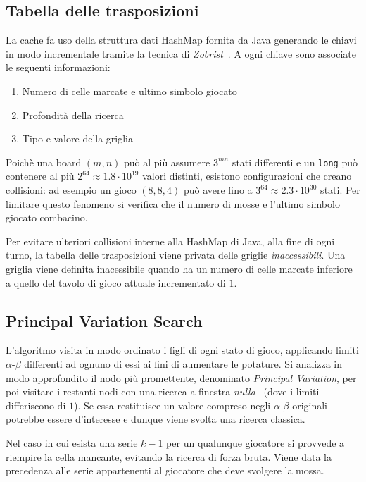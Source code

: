 \documentclass{article}
\begin{document}
\subsection*{Tabella delle trasposizioni}

La cache fa uso della struttura dati HashMap fornita da Java generando le chiavi 
in modo incrementale tramite la tecnica di \emph{Zobrist}~\cite{zobrist}. A ogni
chiave sono associate le seguenti informazioni:
\begin{enumerate}
  \item Numero di celle marcate e ultimo simbolo giocato
  \item Profondit\`a della ricerca
  \item Tipo e valore della griglia
\end{enumerate}
Poich\`e una board $(m,n)$ pu\`o al pi\`u assumere $3^{mn}$ stati differenti e
un \verb!long! pu\`o contenere al pi\`u $2^{64} \approx 1.8 \cdot 10^{19}$ valori distinti,
esistono configurazioni che creano collisioni: ad esempio un gioco $(8, 8, 4)$
pu\`o avere fino a $3^{64} \approx 2.3 \cdot 10^{30}$ stati. Per limitare questo
fenomeno si verifica che il numero di mosse e l'ultimo simbolo giocato combacino.

Per evitare ulteriori collisioni interne alla HashMap di Java, alla fine di
ogni turno, la tabella delle trasposizioni viene privata delle griglie \emph{
inaccessibili}. Una griglia viene definita inacessibile quando ha un numero di
celle marcate inferiore a quello del tavolo di gioco attuale incrementato di $1$.

\subsection*{Principal Variation Search}

L'algoritmo visita in modo ordinato i figli di ogni stato di gioco, applicando
limiti $\alpha$-$\beta$ differenti ad ognuno di essi ai fini di aumentare le potature.
Si analizza in modo approfondito il nodo pi\`u promettente, denominato \emph{Principal
Variation}, per poi visitare i restanti nodi con una ricerca a finestra \emph{nulla}~\cite{scout}
(dove i limiti differiscono di $1$). Se essa restituisce un valore compreso
negli $\alpha$-$\beta$ originali potrebbe essere d'interesse e dunque viene
svolta una ricerca classica.

Nel caso in cui esista una serie $k-1$ per un qualunque giocatore si provvede a
riempire la cella mancante, evitando la ricerca di forza bruta. Viene data la
precedenza alle serie appartenenti al giocatore che deve svolgere la mossa.
\end{document}
